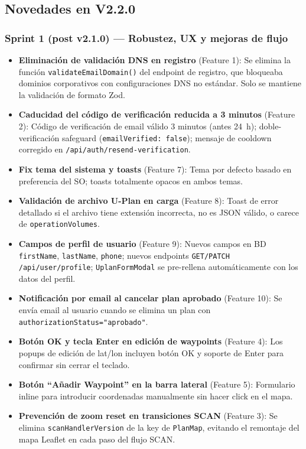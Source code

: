 \documentclass[12pt,a4paper]{article}
\begin{document}
\subsection*{Novedades en V2.2.0}

\subsubsection*{Sprint 1 (post v2.1.0) --- Robustez, UX y mejoras de flujo}
\begin{itemize}
    \item \textbf{Eliminación de validación DNS en registro} (Feature 1): Se elimina la función \texttt{validateEmailDomain()} del endpoint de registro, que bloqueaba dominios corporativos con configuraciones DNS no estándar. Solo se mantiene la validación de formato Zod.
    \item \textbf{Caducidad del código de verificación reducida a 3 minutos} (Feature 2): Código de verificación de email válido 3 minutos (antes 24~h); doble-verificación safeguard (\texttt{emailVerified: false}); mensaje de cooldown corregido en \texttt{/api/auth/resend-verification}.
    \item \textbf{Fix tema del sistema y toasts} (Feature 7): Tema por defecto basado en preferencia del SO; toasts totalmente opacos en ambos temas.
    \item \textbf{Validación de archivo U-Plan en carga} (Feature 8): Toast de error detallado si el archivo tiene extensión incorrecta, no es JSON válido, o carece de \texttt{operationVolumes}.
    \item \textbf{Campos de perfil de usuario} (Feature 9): Nuevos campos en BD \texttt{firstName}, \texttt{lastName}, \texttt{phone}; nuevos endpoints \texttt{GET/PATCH /api/user/profile}; \texttt{UplanFormModal} se pre-rellena automáticamente con los datos del perfil.
    \item \textbf{Notificación por email al cancelar plan aprobado} (Feature 10): Se envía email al usuario cuando se elimina un plan con \texttt{authorizationStatus="aprobado"}.
    \item \textbf{Botón OK y tecla Enter en edición de waypoints} (Feature 4): Los popups de edición de lat/lon incluyen botón OK y soporte de Enter para confirmar sin cerrar el teclado.
    \item \textbf{Botón ``Añadir Waypoint'' en la barra lateral} (Feature 5): Formulario inline para introducir coordenadas manualmente sin hacer click en el mapa.
    \item \textbf{Prevención de zoom reset en transiciones SCAN} (Feature 3): Se elimina \texttt{scanHandlerVersion} de la key de \texttt{PlanMap}, evitando el remontaje del mapa Leaflet en cada paso del flujo SCAN.

\end{itemize}
\end{document}
